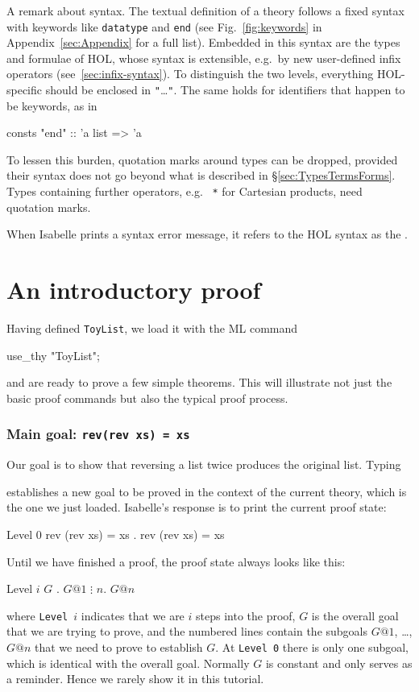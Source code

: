 A remark about syntax.  The textual definition of a theory follows a fixed
syntax with keywords like \texttt{datatype} and \texttt{end} (see
Fig.~\ref{fig:keywords} in Appendix~\ref{sec:Appendix} for a full list).
Embedded in this syntax are the types and formulae of HOL, whose syntax is
extensible, e.g.\ by new user-defined infix operators
(see~\ref{sec:infix-syntax}). To distinguish the two levels, everything
HOL-specific should be enclosed in \texttt{"}\dots\texttt{"}. The same holds
for identifiers that happen to be keywords, as in
\begin{ttbox}
consts "end" :: 'a list => 'a
\end{ttbox}
To lessen this burden, quotation marks around types can be dropped,
provided their syntax does not go beyond what is described in
\S\ref{sec:TypesTermsForms}. Types containing further operators, e.g.\
\label{startype} \texttt{*} for Cartesian products, need quotation marks.

When Isabelle prints a syntax error message, it refers to the HOL syntax as
the \bfindex{inner syntax}.

\section{An introductory proof}
\label{sec:intro-proof}

Having defined \texttt{ToyList}, we load it with the ML command
\begin{ttbox}
use_thy "ToyList";
\end{ttbox}
and are ready to prove a few simple theorems. This will illustrate not just
the basic proof commands but also the typical proof process.

\subsubsection*{Main goal: \texttt{rev(rev xs) = xs}}

Our goal is to show that reversing a list twice produces the original
list. Typing
\begin{ttbox}
\end{ttbox}
establishes a new goal to be proved in the context of the current theory,
which is the one we just loaded. Isabelle's response is to print the current proof state:
\begin{ttbox}
{\out Level 0}
{\out rev (rev xs) = xs}
{. rev (rev xs) = xs}
\end{ttbox}
Until we have finished a proof, the proof state always looks like this:
\begin{ttbox}
{\out Level \(i\)}
{\out \(G\)}
{. \(G@1\)}
{\out  \(\vdots\)}
{\out  \(n\). \(G@n\)}
\end{ttbox}
where \texttt{Level}~$i$ indicates that we are $i$ steps into the proof, $G$
is the overall goal that we are trying to prove, and the numbered lines
contain the subgoals $G@1$, \dots, $G@n$ that we need to prove to establish
$G$. At \texttt{Level 0} there is only one subgoal, which is identical with
the overall goal.  Normally $G$ is constant and only serves as a reminder.
Hence we rarely show it in this tutorial.


